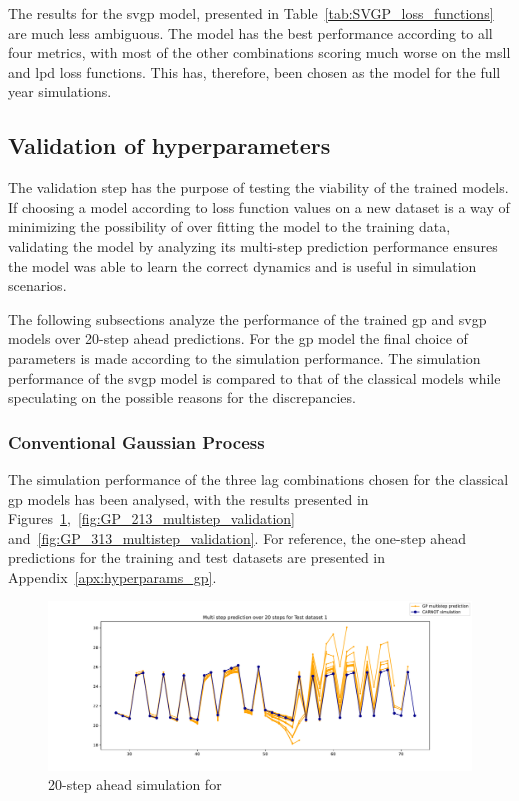 The results for the \acrshort{svgp} model, presented in
Table~\ref{tab:SVGP_loss_functions} are much less ambiguous. The 
model has the best performance according to all four metrics, with most of the
other combinations scoring much worse on the \acrshort{msll} and \acrshort{lpd}
loss functions. This has, therefore, been chosen as the model for the full year
simulations.

\subsection{Validation of hyperparameters}\label{sec:validation_hyperparameters}

The validation step has the purpose of testing the viability of the trained
models. If choosing a model according to loss function values on a new dataset
is a way of minimizing the possibility of over fitting the model to the training
data, validating the model by analyzing its multi-step prediction performance
ensures the model was able to learn the correct dynamics and is useful in
simulation scenarios.

The following subsections analyze the performance of the trained \acrshort{gp}
and \acrshort{svgp} models over 20-step ahead predictions. For the \acrshort{gp}
model the final choice of parameters is made according to the simulation
performance. The simulation performance of the \acrshort{svgp} model is compared
to that of the classical models while speculating on the possible reasons for
the discrepancies.

\subsubsection{Conventional Gaussian Process}

The simulation performance of the three lag combinations chosen for the
classical \acrlong{gp} models has been analysed, with the results presented in
Figures~\ref{fig:GP_113_multistep_validation},~\ref{fig:GP_213_multistep_validation}
and~\ref{fig:GP_313_multistep_validation}. For reference, the one-step ahead
predictions for the training and test datasets are presented in
Appendix~\ref{apx:hyperparams_gp}.


\begin{figure}[ht]
    \centering
    \includegraphics[width =
    \textwidth]{Plots/GP_113_-1pts_test_prediction_20_steps.pdf}
    \vspace{-25pt}
    \caption{20-step ahead simulation for }
    \label{fig:GP_113_multistep_validation}
\end{figure}

